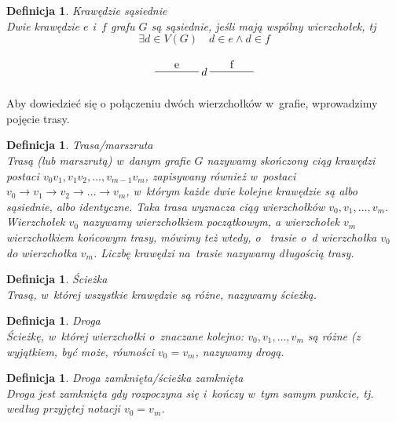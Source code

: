 \documentclass[12pt,a4paper]{report}
\newtheorem{definition}[theorem]{Definicja}
\begin{document}
\begin{definition}{Krawędzie sąsiednie \cite[Rozdział 2]{wilson2008}}\\
Dwie krawędzie $e$ i~$f$ grafu $G$ są sąsiednie, jeśli mają wspólny wierzchołek, tj
$$
\exists{d}\in V(G) \quad d \in e \land d\in f
$$

$$
\begin{tikzpicture}[scale=.7]
  \draw (-1.75,0)-- node[above] {f} ++(2,0);
  \draw node(d) at (-2,0) {$d$};
  \draw (-4.25,0) --node[above] {e} ++(2,0);
\end{tikzpicture}
$$
\end{definition}



Aby dowiedzieć się o połączeniu dwóch wierzchołków w~grafie, wprowadzimy pojęcie trasy.

\begin{definition}{Trasa/marszruta \cite[Rozdział 3]{wilson2008}}\\
Trasą (lub marszrutą) w~danym grafie $G$ nazywamy skończony ciąg krawędzi postaci \newline
$v_{0}v_{1}, v_{1}v_{2}, \ldots,v_{m-1}v_{m}$, zapisywany również w~postaci $v_{0} \rightarrow{} v_{1} \rightarrow{} v_{2} \rightarrow{} \ldots \rightarrow{} v_{m}$, w~którym każde dwie kolejne krawędzie są albo sąsiednie, albo identyczne. Taka trasa wyznacza ciąg wierzchołków $v_{0}, v_{1}, \ldots, v_{m}$. Wierzchołek $v_{0}$ nazywamy wierzchołkiem początkowym, a wierzchołek $v_{m}$ wierzchołkiem końcowym trasy, mówimy też wtedy, o~ trasie o~d wierzchołka $v_{0}$ do wierzchołka $v_{m}$. Liczbę krawędzi na~trasie nazywamy długością trasy. 
\end{definition}

\begin{definition}{Ścieżka \cite[Rozdział 3]{wilson2008}}\\
Trasą, w~której wszystkie krawędzie są różne, nazywamy ścieżką.
\end{definition}


\begin{definition}{Droga \cite[Rozdział 3]{wilson2008}}\\
Ścieżkę, w~której wierzchołki  o~znaczane kolejno: 
$v_{0}, v_{1}, \ldots, v_{m}$ są różne (z wyjątkiem, być może, równości $v_{0}=v_{m}$, nazywamy drogą. 
\end{definition}


\begin{definition}{Droga zamknięta/ścieżka zamknięta \cite[Rozdział 3]{wilson2008}}\\
Droga jest zamknięta gdy rozpoczyna się i~kończy w~tym samym punkcie, tj. według przyjętej notacji $v_{0}=v_{m}$.
\end{definition}
\end{document}

